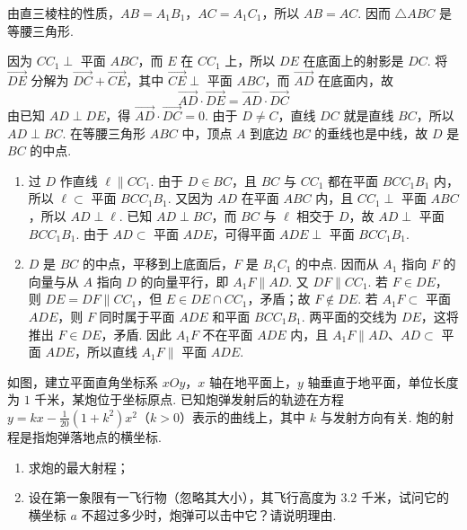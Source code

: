\begin{solution}
由直三棱柱的性质，\(AB=A_{1}B_{1}\)，\(AC=A_{1}C_{1}\)，所以 \(AB=AC\). 因而 \(\triangle ABC\) 是等腰三角形.

因为 \(CC_{1}\perp\) 平面 \(ABC\)，而 \(E\) 在 \(CC_{1}\) 上，所以 \(DE\) 在底面上的射影是 \(DC\). 将 \(\overrightarrow{DE}\) 分解为 \(\overrightarrow{DC}+\overrightarrow{CE}\)，其中 \(\overrightarrow{CE}\perp\) 平面 \(ABC\)，而 \(\overrightarrow{AD}\) 在底面内，故
\[
\overrightarrow{AD}\cdot\overrightarrow{DE}=\overrightarrow{AD}\cdot\overrightarrow{DC}
\]
由已知 \(AD\perp DE\)，得 \(\overrightarrow{AD}\cdot\overrightarrow{DC}=0\).
由于 \(D\neq C\)，直线 \(DC\) 就是直线 \(BC\)，所以 \(AD\perp BC\). 在等腰三角形 \(ABC\) 中，顶点 \(A\) 到底边 \(BC\) 的垂线也是中线，故 \(D\) 是 \(BC\) 的中点.

\begin{enumerate}
\item 过 \(D\) 作直线 \(\ell\parallel CC_{1}\). 由于 \(D\in BC\)，且 \(BC\) 与 \(CC_{1}\) 都在平面 \(BCC_{1}B_{1}\) 内，所以 \(\ell\subset\) 平面 \(BCC_{1}B_{1}\). 又因为 \(AD\) 在平面 \(ABC\) 内，且 \(CC_{1}\perp\) 平面 \(ABC\)，所以 \(AD\perp\ell\). 已知 \(AD\perp BC\)，而 \(BC\) 与 \(\ell\) 相交于 \(D\)，故 \(AD\perp\) 平面 \(BCC_{1}B_{1}\). 由于 \(AD\subset\) 平面 \(ADE\)，可得平面 \(ADE\perp\) 平面 \(BCC_{1}B_{1}\).

\item \(D\) 是 \(BC\) 的中点，平移到上底面后，\(F\) 是 \(B_{1}C_{1}\) 的中点. 因而从 \(A_{1}\) 指向 \(F\) 的向量与从 \(A\) 指向 \(D\) 的向量平行，即 \(A_{1}F\parallel AD\). 又 \(DF\parallel CC_{1}\). 若 \(F\in DE\)，则 \(DE=DF\parallel CC_{1}\)，但 \(E\in DE\cap CC_{1}\)，矛盾；故 \(F\notin DE\). 若 \(A_{1}F\subset\) 平面 \(ADE\)，则 \(F\) 同时属于平面 \(ADE\) 和平面 \(BCC_{1}B_{1}\). 两平面的交线为 \(DE\)，这将推出 \(F\in DE\)，矛盾. 因此 \(A_{1}F\) 不在平面 \(ADE\) 内，且 \(A_{1}F\parallel AD\)、\(AD\subset\) 平面 \(ADE\)，所以直线 \(A_{1}F\parallel\) 平面 \(ADE\).
\end{enumerate}
\end{solution}

\begin{problem}
如图，建立平面直角坐标系 \(xOy\)，\(x\) 轴在地平面上，\(y\) 轴垂直于地平面，单位长度为 \(1\) 千米，某炮位于坐标原点. 已知炮弹发射后的轨迹在方程 \(y = kx - \frac{1}{20}(1+k^2)x^2\)（\(k>0\)）表示的曲线上，其中 \(k\) 与发射方向有关. 炮的射程是指炮弹落地点的横坐标.

\begin{enumerate}
\item 求炮的最大射程；
\item 设在第一象限有一飞行物（忽略其大小），其飞行高度为 \(3.2\) 千米，试问它的横坐标 \(a\) 不超过多少时，炮弹可以击中它？请说明理由.
\end{enumerate}
\end{problem}

